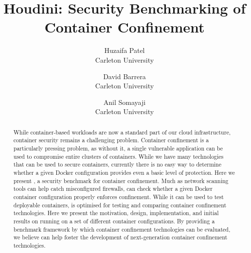 \documentclass[letterpaper,twocolumn,10pt]{article}
\begin{document}


\title{\Large \bf Houdini: Security Benchmarking of Container Confinement}
\author{
{\rm Huzaifa Patel}\\
Carleton University
\and
{\rm David Barrera}\\
Carleton University
\and
{\rm Anil Somayaji}\\
Carleton University
} %

\maketitle

\begin{abstract}
  While container-based workloads are now a standard part of our cloud infrastructure, container security remains a challenging problem. Container confinement is a particularly pressing problem, as without it, a single vulnerable application can be used to compromise entire clusters of containers. While we have many technologies that can be used to secure containers, currently there is no easy way to determine whether a given Docker configuration provides even a basic level of protection. Here we present \houdini, a security benchmark for container confinement. Much as network scanning tools can help catch misconfigured firewalls, \houdini can check whether a given Docker container configuration properly enforces confinement. While it can be used to test deployable containers, \houdini is optimised for testing and comparing container confinement technologies. Here we present the motivation, design, implementation, and initial results on running \houdini on a set of different container configurations. By providing a benchmark framework by which container confinement technologies can be evaluated, we believe \houdini can help foster the development of next-generation container confinement technologies.
\end{abstract}







% 





\end{document}
